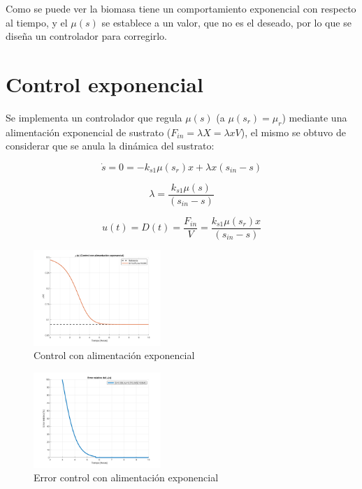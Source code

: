 \documentclass[letterpaper, 10 pt, conference]{ieeeconf}  %
\begin{document}
Como se puede ver la biomasa tiene un comportamiento exponencial con respecto al tiempo, y el $\mu(s)$ se establece a un valor, que no es el deseado, por lo que se diseña un controlador para corregirlo.

\section{Control exponencial}
Se implementa un controlador que regula \(\mu(s)\) (a \(\mu(s_r)=\mu_r\)) mediante una alimentación exponencial de sustrato ($F_{in}=\lambda X=\lambda xV$), el mismo se obtuvo de considerar que se anula la dinámica del sustrato:

\begin{equation*}
  \dot{s} = 0 = -k_{s1}\mu(s_r)x+\lambda x (s_{in}-s)
\end{equation*}

\begin{equation*}
  \lambda = \frac{k_{s1}\mu(s)}{(s_{in}-s)}
\end{equation*}

\begin{equation*}
  u(t) = D(t) = \frac{F_{in}}{V} = \frac{k_{s1}\mu(s_r)x}{(s_{in}-s)}
\end{equation*}

\begin{figure}[H]
  \centering
  \includegraphics[width=0.43\textwidth]{./Images_tp3/exp.png}
  \caption{Control con alimentación exponencial}
\end{figure}
\begin{figure}[H]
  \centering
  \includegraphics[width=0.43\textwidth]{./Images_tp3/exp_err.png}
  \caption{Error control con alimentación exponencial}
\end{figure}
\end{document}
